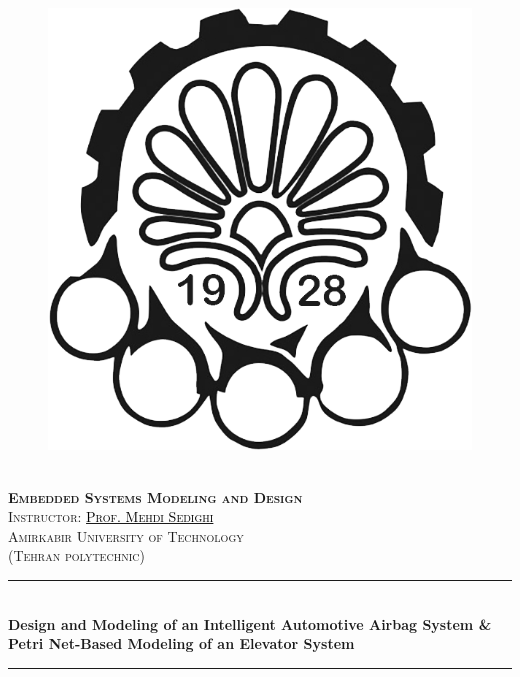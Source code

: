 \documentclass[12pt	]{article}
\newcommand{\HRule}{\rule{\linewidth}{0.5mm}} %
\begin{document}
\begin{center}
    \begin{figure}
        \vspace{-1.0cm}
        \centering
        \includegraphics[scale = 0.35]{Images/AUT_logo.png} %
    \end{figure}
    \mbox{}\\[2.0cm]
    \textsc{\Huge \textbf{Embedded Systems Modeling and Design}}\\[1.0cm]
    \textsc{\LARGE Instructor: \href{https://scholar.google.com/citations?user=2RN0Y2YAAAAJ&hl=en}{\textcolor{black}{Prof. Mehdi Sedighi}}}\\[2.5cm]
    \textsc{\LARGE Amirkabir University of Technology} \\%
    \textsc{(Tehran polytechnic)}
    \HRule\\[0.4cm]
    {\large \bf {\selectfont Design and Modeling of an Intelligent Automotive Airbag System \& Petri Net-Based Modeling of an Elevator System} }\\[0.2cm]
    \HRule\\[1.5cm]
\end{center}
\end{document}
